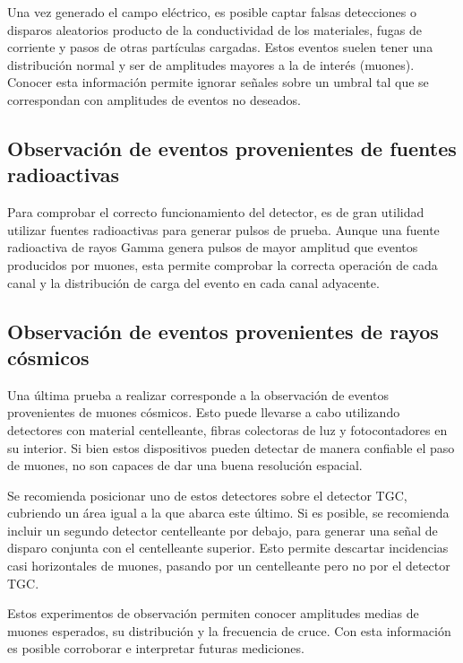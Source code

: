 		Una vez generado el campo eléctrico, es posible captar falsas detecciones o disparos aleatorios producto de la conductividad de los materiales, fugas de corriente y pasos de otras partículas cargadas. Estos eventos suelen tener una distribución normal y ser de amplitudes mayores a la de interés (muones). Conocer esta información permite ignorar señales sobre un umbral tal que se correspondan con amplitudes de eventos no deseados.
	
	\subsection{Observación de eventos provenientes de fuentes radioactivas}
		Para comprobar el correcto funcionamiento del detector, es de gran utilidad utilizar fuentes radioactivas para generar pulsos de prueba. Aunque una fuente radioactiva de rayos Gamma genera pulsos de mayor amplitud que eventos producidos por muones, esta permite comprobar la correcta operación de cada canal y la distribución de carga del evento en cada canal adyacente.
	
	\subsection{Observación de eventos provenientes de rayos cósmicos}
		Una última prueba a realizar corresponde a la observación de eventos provenientes de muones cósmicos. Esto puede llevarse a cabo utilizando detectores con material centelleante, fibras colectoras de luz y fotocontadores en su interior. Si bien estos dispositivos pueden detectar de manera confiable el paso de muones, no son capaces de dar una buena resolución espacial.
		
		Se recomienda posicionar uno de estos detectores sobre el detector TGC, cubriendo un área igual a la que abarca este último. Si es posible, se recomienda incluir un segundo detector centelleante por debajo, para generar una señal de disparo conjunta con el centelleante superior. Esto permite descartar incidencias casi horizontales de muones, pasando por un centelleante pero no por el detector TGC.
		
		Estos experimentos de observación permiten conocer amplitudes medias de muones esperados, su distribución y la frecuencia de cruce. Con esta información es posible corroborar e interpretar futuras mediciones.